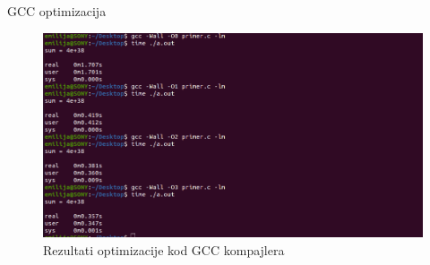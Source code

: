 \documentclass[compress, containsverbatim,mathserif, xcolor=dvipsnames, unicode]{beamer}
\begin{document}
\begin{frame}{GCC optimizacija} %
    \begin{figure}[h!]
        \begin{center}
       \includegraphics[scale = 0.2]{../pics/test.png}
       \end{center}
       \caption{Rezultati optimizacije kod GCC kompajlera}
    \end{figure} 
\end{frame}
\end{document}
